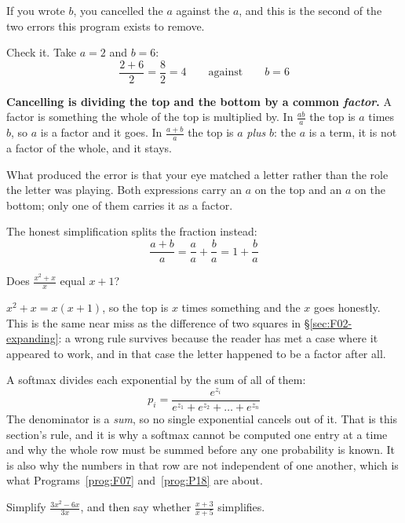 \begin{fr}
\begin{ansblock}
If you wrote $b$, you cancelled the $a$ against the $a$, and this is the second
of the two errors this program exists to remove.

Check it. Take $a = 2$ and $b = 6$:
\[ \frac{2 + 6}{2} = \frac{8}{2} = 4 \qquad \text{against} \qquad b = 6 \]
\end{ansblock}

\begin{trapbox}
\textbf{Cancelling is dividing the top and the bottom by a common
\emph{factor}.} A factor is something the whole of the top is multiplied by. In
$\frac{ab}{a}$ the top is $a$ times $b$, so $a$ is a factor and it goes. In
$\frac{a + b}{a}$ the top is $a$ \emph{plus} $b$: the $a$ is a term, it is not
a factor of the whole, and it stays.

What produced the error is that your eye matched a letter rather than the role
the letter was playing. Both expressions carry an $a$ on the top and an $a$ on
the bottom; only one of them carries it as a factor.

The honest simplification splits the fraction instead:
\[ \frac{a + b}{a} = \frac{a}{a} + \frac{b}{a} = 1 + \frac{b}{a} \]
\end{trapbox}
Does $\frac{x^{2} + x}{x}$ equal $x + 1$?
\nextframe
\end{fr}

\begin{fr}
$x^{2} + x = x(x + 1)$, so the top is $x$ times something and the $x$ goes
honestly. This is the same near miss as the difference of two squares in
\S\ref{sec:F02-expanding}: a wrong rule survives because the reader has met a
case where it appeared to work, and in that case the letter happened to be a
factor after all.

\begin{aibox}
A softmax divides each exponential by the sum of all of them:
\[ p_{i} = \frac{e^{z_{i}}}{e^{z_{1}} + e^{z_{2}} + \dots + e^{z_{n}}} \]
The denominator is a \emph{sum}, so no single exponential cancels out of it.
That is this section's rule, and it is why a softmax cannot be computed one
entry at a time and why the whole row must be summed before any one probability
is known. It is also why the numbers in that row are not independent of one
another, which is what Programs~\ref{prog:F07} and~\ref{prog:P18} are about.
\end{aibox}

\yourturn
Simplify $\frac{3x^{2} - 6x}{3x}$, and then say whether
$\frac{x + 3}{x + 5}$ simplifies.
\dotline
\nextframe
\end{fr}

